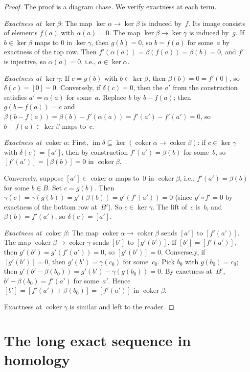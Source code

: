 \documentclass[12pt,a4paper,openany]{book}
\theoremstyle{definition}
\theoremstyle{plain}
\theoremstyle{remark}
\DeclareMathOperator{\im}{im}
\DeclareMathOperator{\coker}{coker}
\begin{document}
\begin{proof}
The proof is a diagram chase.  We verify exactness at each term.

\textit{Exactness at $\ker\beta$}:
The map $\ker\alpha\to\ker\beta$ is induced by~$f$.  Its image consists
of elements $f(a)$ with $\alpha(a)=0$.  The map $\ker\beta\to\ker\gamma$
is induced by~$g$.  If $b\in\ker\beta$ maps to $0$ in $\ker\gamma$, then
$g(b)=0$, so $b=f(a)$ for some~$a$ by exactness of the top row.
Then $f'(\alpha(a))=\beta(f(a))=\beta(b)=0$, and $f'$ is injective, so
$\alpha(a)=0$, i.e., $a\in\ker\alpha$.

\textit{Exactness at $\ker\gamma$}:
If $c=g(b)$ with $b\in\ker\beta$, then $\beta(b)=0=f'(0)$, so
$\delta(c)=[0]=0$.  Conversely, if $\delta(c)=0$, then the $a'$
from the construction satisfies $a'=\alpha(a)$ for some~$a$.  Replace
$b$ by $b-f(a)$; then $g(b-f(a))=c$ and $\beta(b-f(a))=\beta(b)-f'(\alpha(a))=f'(a')-f'(a')=0$, so $b-f(a)\in\ker\beta$ maps to~$c$.

\textit{Exactness at $\coker\alpha$}:
First, $\im\delta\subseteq\ker(\coker\alpha\to\coker\beta)$: if $c\in\ker\gamma$
with $\delta(c)=[a']$, then by construction $f'(a')=\beta(b)$ for some~$b$,
so $[f'(a')]=[\beta(b)]=0$ in $\coker\beta$.

Conversely, suppose $[a']\in\coker\alpha$ maps to~$0$ in $\coker\beta$,
i.e., $f'(a')=\beta(b)$ for some $b\in B$.  Set $c=g(b)$.  Then
$\gamma(c)=\gamma(g(b))=g'(\beta(b))=g'(f'(a'))=0$ (since $g'\circ f'=0$
by exactness of the bottom row at~$B'$).  So $c\in\ker\gamma$.  The
lift of~$c$ is~$b$, and $\beta(b)=f'(a')$, so $\delta(c)=[a']$.

\textit{Exactness at $\coker\beta$}:
The map $\coker\alpha\to\coker\beta$ sends $[a']$ to $[f'(a')]$.  The
map $\coker\beta\to\coker\gamma$ sends $[b']$ to $[g'(b')]$.
If $[b']=[f'(a')]$, then $g'(b')=g'(f'(a'))=0$, so $[g'(b')]=0$.
Conversely, if $[g'(b')]=0$, then $g'(b')=\gamma(c_0)$ for some~$c_0$.
Pick $b_0$ with $g(b_0)=c_0$; then $g'(b'-\beta(b_0))=g'(b')-\gamma(g(b_0))=0$.
By exactness at~$B'$, $b'-\beta(b_0)=f'(a')$ for some~$a'$.
Hence $[b']=[f'(a')+\beta(b_0)]=[f'(a')]$ in $\coker\beta$.

Exactness at $\coker\gamma$ is similar and left to the reader.
\end{proof}

\section{The long exact sequence in homology}\label{sec:les-homology}
\end{document}
